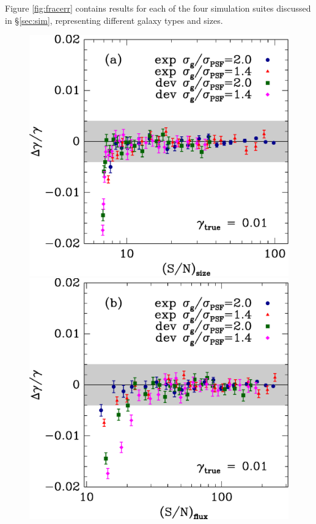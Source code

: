 \documentclass[12pt,preprint]{aastex}
\begin{document}
Figure \ref{fig:fracerr} contains results for each of the four simulation
suites discussed in \S \ref{sec:sim}, representing different galaxy types and
sizes. 

\begin{figure}[p] \centering
 \centering 
 \includegraphics[scale=0.45]{figures/cbafit-geg-T-s2n.eps}
 \includegraphics[scale=0.45]{figures/cbafit-geg-flux-s2n.eps}


\end{figure}
\end{document}
